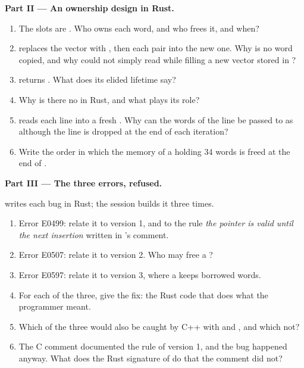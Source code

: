 \begin{problem}
\medskip\noindent\textbf{Part II --- An ownership design in Rust.}\par\nopagebreak
{}
\begin{enumerate}[resume, beginpenalty=10000]
\item The slots are . Who owns each word, and who frees it, and when?
\item {} replaces the vector with , then  each pair into the new one. Why is no
word copied, and why could  not simply read  while filling a new vector stored in
?
\item {} returns . What does its elided lifetime say?
\item Why is there no  in Rust, and what plays its role?
\item {} reads each line into a fresh . Why can the words of the line be passed to
 as  although the line is dropped at the end of each iteration?
\item Write the order in which the memory of a  holding 34 words is freed at the end of .
\end{enumerate}

\medskip\noindent\textbf{Part III --- The three errors, refused.}\par\nopagebreak
{} writes each bug in Rust; the session builds it three times.
\begin{enumerate}[resume, beginpenalty=10000]
\item Error E0499: relate it to version 1, and to the rule \emph{the pointer is valid until the next insertion}
written in 's comment.
\item Error E0507: relate it to version 2. Who may free a ?
\item Error E0597: relate it to version 3, where a  keeps borrowed words.
\item For each of the three, give the fix: the Rust code that does what the programmer meant.
\item Which of the three would also be caught by C++ with  and , and which
not?
\item The C comment documented the rule of version 1, and the bug happened anyway. What does the Rust signature of
 do that the comment did not?
\end{enumerate}


\end{problem}
